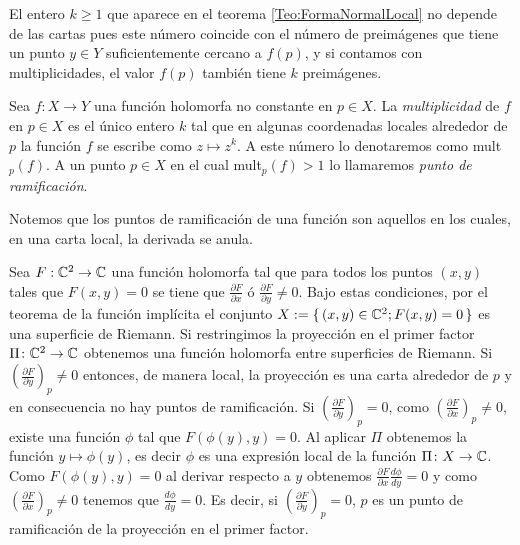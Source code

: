 El entero $k\geq 1$ que aparece en el teorema \ref{Teo:FormaNormalLocal} no depende de las cartas pues este número coincide con el número de preimágenes que tiene un punto $y\in Y$ suficientemente cercano a $f(p)$, y si contamos con multiplicidades, el valor $f(p)$ también tiene $k$ preimágenes.

\begin{defn}
\label{Def:Multiplicidad}
Sea $f\colon X\rightarrow Y$ una función holomorfa no constante en $p\in X$. La \emph{multiplicidad} de $f$ en $p\in X$ es el único entero $k$ tal que en algunas coordenadas locales alrededor de $p$ la función $f$ se escribe como $z\mapsto z^{k}$. A este número lo denotaremos como mult$_{p}(f)$. A un punto $p\in X$ en el cual mult$_{p}(f)>1$ lo llamaremos \emph{punto de ramificación}.
\end{defn}

Notemos que los puntos de ramificación de una función son aquellos en los cuales, en una carta local, la derivada se anula.

\begin{Ejemplo}
\label{Ej:Proyeccion}
Sea $F:\mathbb{C}^{2}\rightarrow \mathbb{C}$ una función holomorfa tal que para todos los puntos $(x,y)$ tales que $F(x,y)=0$ se tiene que $\tfrac{\partial F}{\partial x}$ ó $\tfrac{\partial F}{\partial y}\neq 0$. Bajo estas condiciones, por el teorema de la función implícita el conjunto $X:=\{\, (x,y)\in\mathbb{C}^{2}; F(x,y)=0 \, \}$ es una superficie de Riemann. Si restringimos la proyección en el primer factor $\Pi\colon\mathbb{C}^{2}\rightarrow\mathbb{C}$ obtenemos una función holomorfa entre superficies de Riemann. Si $(\tfrac{\partial F}{\partial y})_{p}\neq 0$ entonces, de manera local, la proyección es una carta alrededor de $p$ y en consecuencia no hay puntos de ramificación. Si $(\tfrac{\partial F}{\partial y})_{p}= 0$, como $(\tfrac{\partial F}{\partial x})_{p}\neq 0$, existe una función $\phi$ tal que $F(\phi(y),y)=0$. Al aplicar $\Pi$ obtenemos la función $y\mapsto\phi(y)$, es decir $\phi$ es una expresión local de la función $\Pi\colon X\rightarrow \mathbb{C}$. Como $F(\phi(y),y)=0$ al derivar respecto a $y$ obtenemos $\tfrac{\partial F}{\partial x}\tfrac{d\phi}{dy}=0$ y como $(\tfrac{\partial F}{\partial x})_{p}\neq 0$ tenemos que $\tfrac{d\phi}{dy}=0$. Es decir, si $(\tfrac{\partial F}{\partial y})_{p}= 0$, $p$ es un punto de ramificación de la proyección en el primer factor.
\end{Ejemplo}

